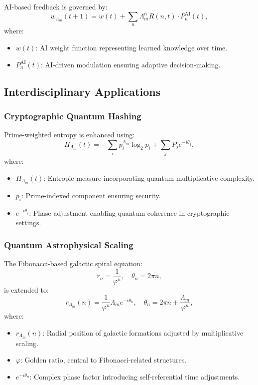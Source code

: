 \documentclass{article}
\theoremstyle{plain}
\begin{document}
\begin{itemize}
\begin{itemize}
AI-based feedback is governed by:
\begin{equation}
w_{\Lambda_m}(t+1) = w(t) + \sum_{n} \Lambda_m^n R(n, t) \cdot P_n^{\text{AI}}(t),
\end{equation}
where:
\begin{itemize}
    \item $w(t)$: AI weight function representing learned knowledge over time.
    \item $P_n^{\text{AI}}(t)$: AI-driven modulation ensuring adaptive decision-making.
\end{itemize}

\subsection{Interdisciplinary Applications}
\subsubsection{Cryptographic Quantum Hashing}
Prime-weighted entropy is enhanced using:
\begin{equation}
H_{\Lambda_m}(t) = -\sum_{i} p_i^{\Lambda_m} \log_2 p_i + \sum_{j} P_j e^{-i\theta_j},
\end{equation}
where:
\begin{itemize}
    \item $H_{\Lambda_m}(t)$: Entropic measure incorporating quantum multiplicative complexity.
    \item $p_i$: Prime-indexed component ensuring security.
    \item $e^{-i\theta_j}$: Phase adjustment enabling quantum coherence in cryptographic settings.
\end{itemize}

\subsubsection{Quantum Astrophysical Scaling}
The Fibonacci-based galactic spiral equation:
\begin{equation}
r_n = \frac{1}{\varphi^n}, \quad \theta_n = 2\pi n,
\end{equation}
is extended to:
\begin{equation}
r_{\Lambda_m}(n) = \frac{1}{\varphi^n} \Lambda_m e^{-i\theta_n}, \quad \theta_n = 2\pi n + \frac{\Lambda_m}{\varphi^n},
\end{equation}
where:
\begin{itemize}
    \item $r_{\Lambda_m}(n)$: Radial position of galactic formations adjusted by multiplicative scaling.
    \item $\varphi$: Golden ratio, central to Fibonacci-related structures.
    \item $e^{-i\theta_n}$: Complex phase factor introducing self-referential time adjustments.
\end{itemize}


\end{itemize}
\end{itemize}
\end{document}
